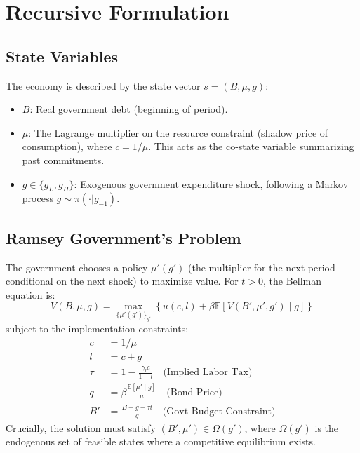 \section{Recursive Formulation}

\subsection{State Variables}
The economy is described by the state vector $s = (B, \mu, g)$:
\begin{itemize}
    \item $B$: Real government debt (beginning of period).
    \item $\mu$: The Lagrange multiplier on the resource constraint (shadow price of consumption), where $c = 1/\mu$. This acts as the co-state variable summarizing past commitments.
    \item $g \in \{g_L, g_H\}$: Exogenous government expenditure shock, following a Markov process $g \sim \pi(\cdot|g_{-1})$.
\end{itemize}

\subsection{Ramsey Government's Problem}
The government chooses a policy $\mu'(g')$ (the multiplier for the next period conditional on the next shock) to maximize value.
For $t > 0$, the Bellman equation is:
\begin{equation}\label{eq:bellman}
V(B, \mu, g) = \max_{\{\mu'(g')\}_{g'}} \left\{ u(c, l) + \beta \mathbb{E}[V(B', \mu', g') \mid g] \right\}
\end{equation}
subject to the implementation constraints:
\begin{align}
    c &= 1/\mu \\
    l &= c + g \\
    \tau &= 1 - \frac{\gamma_l c}{1 - l} \quad \text{(Implied Labor Tax)} \\
    q &= \beta \frac{\mathbb{E}[\mu' \mid g]}{\mu} \quad \text{(Bond Price)} \\
    B' &= \frac{B + g - \tau l}{q} \quad \text{(Govt Budget Constraint)} \label{eq:budget_dynamic}
\end{align}
Crucially, the solution must satisfy $(B', \mu') \in \Omega(g')$, where $\Omega(g')$ is the endogenous set of feasible states where a competitive equilibrium exists.


